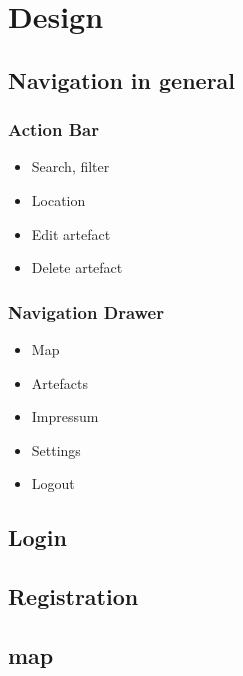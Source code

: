 \newpage
\chapter{Design}\label{cap:Design}

\section{Navigation in general}
\subsection{Action Bar}
\begin{itemize}
\item Search, filter
\item Location
\item Edit artefact
\item Delete artefact
\end{itemize}
\subsection{Navigation Drawer}
\begin{itemize}
\item Map
\item Artefacts
\item Impressum
\item Settings
\item Logout
\end{itemize}

\section{Login}

\section{Registration}

\section{map}

